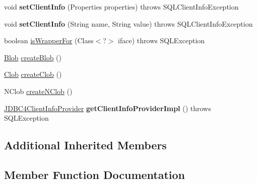 \begin{DoxyCompactItemize}
\item 
\mbox{\label{classcom_1_1mysql_1_1jdbc_1_1_j_d_b_c4_connection_af8bfc97dbc7dbf5f7e45136c4f1d5731}} 
void {\bfseries set\+Client\+Info} (Properties properties)  throws S\+Q\+L\+Client\+Info\+Exception 
\item 
\mbox{\label{classcom_1_1mysql_1_1jdbc_1_1_j_d_b_c4_connection_a3853bc25ecc77b3bff6ec12ce9015082}} 
void {\bfseries set\+Client\+Info} (String name, String value)  throws S\+Q\+L\+Client\+Info\+Exception 
\item 
boolean \mbox{\hyperlink{classcom_1_1mysql_1_1jdbc_1_1_j_d_b_c4_connection_a4c49247c494fead999902d1e8f0921b6}{is\+Wrapper\+For}} (Class$<$?$>$ iface)  throws S\+Q\+L\+Exception 
\item 
\mbox{\hyperlink{classcom_1_1mysql_1_1jdbc_1_1_blob}{Blob}} \mbox{\hyperlink{classcom_1_1mysql_1_1jdbc_1_1_j_d_b_c4_connection_a3b0ede9b029e66047df426bbf0dc6ba3}{create\+Blob}} ()
\item 
\mbox{\hyperlink{classcom_1_1mysql_1_1jdbc_1_1_clob}{Clob}} \mbox{\hyperlink{classcom_1_1mysql_1_1jdbc_1_1_j_d_b_c4_connection_a289c31cdb97f40e0fb1411cb0600b212}{create\+Clob}} ()
\item 
N\+Clob \mbox{\hyperlink{classcom_1_1mysql_1_1jdbc_1_1_j_d_b_c4_connection_a8be144d15039acec709f079aefcbb1be}{create\+N\+Clob}} ()
\item 
\mbox{\label{classcom_1_1mysql_1_1jdbc_1_1_j_d_b_c4_connection_a01898261631952ee18a9bfb5d0ee2d6d}} 
\mbox{\hyperlink{interfacecom_1_1mysql_1_1jdbc_1_1_j_d_b_c4_client_info_provider}{J\+D\+B\+C4\+Client\+Info\+Provider}} {\bfseries get\+Client\+Info\+Provider\+Impl} ()  throws S\+Q\+L\+Exception 
\end{DoxyCompactItemize}
\subsection*{Additional Inherited Members}


\subsection{Member Function Documentation}
\mbox{\label{classcom_1_1mysql_1_1jdbc_1_1_j_d_b_c4_connection_a3b0ede9b029e66047df426bbf0dc6ba3}} 
